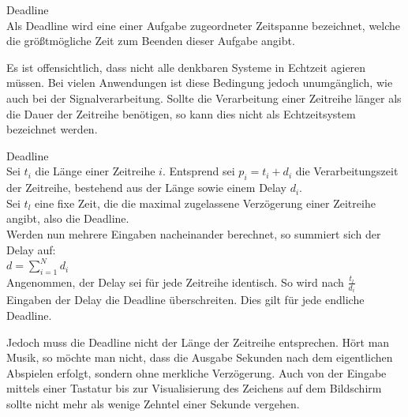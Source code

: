 \begin{definition}{Deadline}\\
Als Deadline wird eine einer Aufgabe zugeordneter Zeitspanne bezeichnet, welche die größtmögliche Zeit zum Beenden dieser Aufgabe angibt.
\end{definition}

Es ist offensichtlich, dass nicht alle denkbaren Systeme in Echtzeit agieren müssen. Bei vielen Anwendungen ist diese Bedingung jedoch unumgänglich, wie auch bei der Signalverarbeitung. Sollte die Verarbeitung einer Zeitreihe länger als die Dauer der Zeitreihe benötigen, so kann dies nicht als Echtzeitsystem bezeichnet werden.\\

\begin{bew}{Deadline}\\
Sei $t_i$ die Länge einer Zeitreihe $i$. Entsprend sei $p_i = t_i + d_i$ die Verarbeitungszeit der Zeitreihe, bestehend aus der Länge sowie einem Delay $d_i$.\\
Sei $t_l$ eine fixe Zeit, die die maximal zugelassene Verzögerung einer Zeitreihe angibt, also die Deadline.\\
Werden nun mehrere Eingaben nacheinander berechnet, so summiert sich der Delay auf:\\
$d = \sum_{i=1}^N d_i$\\
Angenommen, der Delay sei für jede Zeitreihe identisch. So wird nach $\frac{t_l}{d_i}$ Eingaben der Delay die Deadline überschreiten. Dies gilt für jede endliche Deadline.
\end{bew}
Jedoch muss die Deadline nicht der Länge der Zeitreihe entsprechen. Hört man Musik, so möchte man nicht, dass die Ausgabe Sekunden nach dem eigentlichen Abspielen erfolgt, sondern ohne merkliche Verzögerung. Auch von der Eingabe mittels einer Tastatur bis zur Visualisierung des Zeichens auf dem Bildschirm sollte nicht mehr als wenige Zehntel einer Sekunde vergehen.

